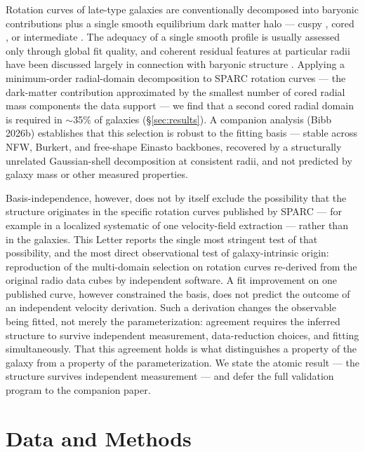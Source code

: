 \documentclass[linenumbers,twocolumn]{aastex701}
\begin{document}
Rotation curves of late-type galaxies are conventionally decomposed into
baryonic contributions plus a single smooth equilibrium dark matter halo ---
cuspy \citep[NFW;][]{Navarro1996}, cored \citep[Burkert;][]{Burkert1995}, or
intermediate \citep[Einasto;][]{Einasto1965}. The adequacy of a single smooth
profile is usually assessed only through global fit quality, and coherent
residual features at particular radii have been discussed largely in connection
with baryonic structure \citep[``Renzo's rule'';][]{Sancisi2004}. Applying a
minimum-order radial-domain decomposition to SPARC rotation curves
\citep{Lelli2016} --- the dark-matter contribution approximated by the smallest number
of cored radial mass components the data support --- we find that a second cored radial
domain is required in $\sim$35\% of galaxies (\S\ref{sec:results}). A companion
analysis (Bibb 2026b) establishes that this selection is robust to the fitting basis
--- stable across NFW, Burkert, and free-shape Einasto backbones, recovered by a
structurally unrelated Gaussian-shell decomposition at consistent radii, and not
predicted by galaxy mass or other measured properties.

Basis-independence, however, does not by itself exclude the possibility that the
structure originates in the specific rotation curves published by SPARC --- for
example in a localized systematic of one velocity-field extraction --- rather
than in the galaxies. This Letter reports the single most stringent test of that
possibility, and the most direct observational test of galaxy-intrinsic origin:
reproduction of the multi-domain selection on rotation curves re-derived from the
original radio data cubes by independent software. A fit improvement on one
published curve, however constrained the basis, does not predict the outcome of
an independent velocity derivation. Such a derivation changes the observable being
fitted, not merely the parameterization: agreement requires the inferred structure to
survive independent measurement, data-reduction choices, and fitting simultaneously.
That this agreement holds is what distinguishes a property of the galaxy from a property
of the parameterization. We state the atomic result --- the
structure survives independent measurement --- and defer the full validation program
to the companion paper.

\section{Data and Methods} \label{sec:methods}
\end{document}
